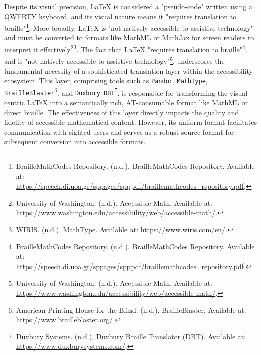 Despite its visual precision, LaTeX is considered a "pseudo-code" written using a QWERTY keyboard, and its visual nature means it "requires translation to braille"\footnote{BrailleMathCodes Repository. (n.d.). BrailleMathCodes Repository. Available at: \url{https://speech.di.uoa.gr/sppages/spppdf/braillemathcodes_repository.pdf}.}. More broadly, LaTeX is "not natively accessible to assistive technology" and must be converted to formats like MathML or MathJax for screen readers to interpret it effectively\footnote{University of Washington. (n.d.). Accessible Math. Available at: \url{https://www.washington.edu/accessibility/web/accessible-math/}.}\footnote{WIRIS. (n.d.). MathType. Available at: \url{https://www.wiris.com/en/}.}. The fact that LaTeX "requires translation to braille"\footnote{BrailleMathCodes Repository. (n.d.). BrailleMathCodes Repository. Available at: \url{https://speech.di.uoa.gr/sppages/spppdf/braillemathcodes_repository.pdf}.}. and is "not natively accessible to assistive technology"\footnote{University of Washington. (n.d.). Accessible Math. Available at: \url{https://www.washington.edu/accessibility/web/accessible-math/}.}. underscores the fundamental necessity of a sophisticated translation layer within the accessibility ecosystem. This layer, comprising tools such as \texttt{Pandoc}, \texttt{MathType}, \href{https://www.brailleblaster.org/}{\texttt{BrailleBlaster}}\footnote{American Printing House for the Blind. (n.d.). BrailleBlaster. Available at: \url{https://www.brailleblaster.org/}.}. and \href{https://www.duxburysystems.com/}{\texttt{Duxbury DBT}}\footnote{Duxbury Systems. (n.d.). Duxbury Braille Translator (DBT). Available at: \url{https://www.duxburysystems.com/}.}. is responsible for transforming the visual-centric LaTeX into a semantically rich, AT-consumable format like MathML or direct braille. The effectiveness of this layer directly impacts the quality and fidelity of accessible mathematical content. However, its uniform format facilitates communication with sighted users and serves as a robust source format for subsequent conversion into accessible formats.


